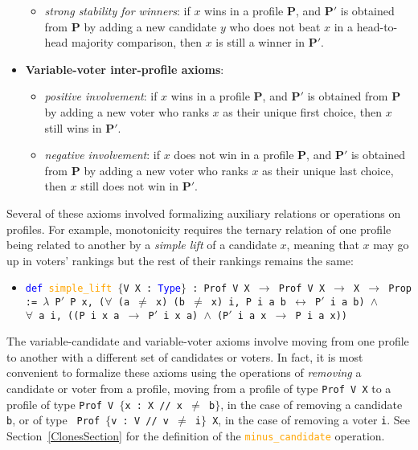 \documentclass[runningheads]{llncs}
\begin{document}
\begin{itemize}
\begin{itemize}
\item \textit{strong stability for winners}: if $x$ wins in a profile $\mathbf{P}$, and $\mathbf{P}'$ is obtained from $\mathbf{P}$ by adding a new candidate $y$ who does not beat $x$ in a head-to-head majority comparison, then $x$ is still a winner in $\mathbf{P}'$. \\
\end{itemize}
\item[] \textbf{Variable-voter inter-profile axioms}:
\begin{itemize}
\item \textit{positive involvement}: if $x$ wins in a profile $\mathbf{P}$, and $\mathbf{P}'$ is obtained from $\mathbf{P}$ by adding a new voter who ranks $x$ as their unique first choice, then $x$ still wins in $\mathbf{P}'$.
\item \textit{negative involvement}: if $x$ does not win in a profile $\mathbf{P}$, and $\mathbf{P}'$ is obtained from $\mathbf{P}$ by adding a new voter who ranks $x$ as their unique last choice, then $x$ still does not win in $\mathbf{P}'$.
\end{itemize}
\end{itemize}

Several of these axioms involved formalizing auxiliary relations or operations on profiles. For example, monotonicity requires the ternary relation of one profile being related to another by a \textit{simple lift} of a candidate $x$, meaning that $x$ may go up in voters' rankings but the rest of their rankings remains the same:

\begin{itemize}
\item[] \texttt{\textcolor{blue}{def} \textcolor{orange}{simple\_lift} $\{$V X : \textcolor{blue}{Type}$\}$ : Prof V X $\to$ Prof V X $\to$ X $\to$ Prop := 
    $\lambda$ P$'$ P x, ($\forall$ (a $\neq$ x) (b $\neq$ x) i, P i a b $\leftrightarrow$ P$'$ i a b) 
    $\wedge$  \\$\forall$ a i, ((P i x a $\to$ P$'$ i x a) $\wedge$ (P$'$ i a x $\to$ P i a x))}
 \end{itemize}
The variable-candidate and variable-voter axioms involve moving from one profile to another with a different set of candidates or voters. In fact, it is most convenient to formalize these axioms using the operations of \textit{removing} a candidate or voter from a profile, moving from a profile of type \texttt{Prof V X} to a profile of type  \texttt{Prof V $\{$x : X // x $\neq$ b$\}$}, in the case of removing a candidate \texttt{b}, or of type  \texttt{ Prof $\{$v : V // v $\neq$ i$\}$ X}, in the case of removing a voter \texttt{i}. See Section~\ref{ClonesSection} for the definition of the \textcolor{orange}{\texttt{minus\_candidate}} operation.
\end{document}
